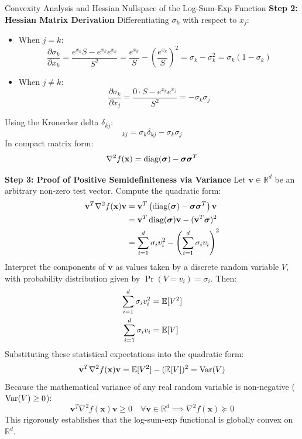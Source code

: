 \begin{examplebox}[breakable]{Convexity Analysis and Hessian Nullspace of the Log-Sum-Exp Function}
\textbf{Step 2: Hessian Matrix Derivation}
Differentiating $\sigma_k$ with respect to $x_j$:
\begin{itemize}
    \item When $j = k$:
    \begin{equation}
    \frac{\partial \sigma_k}{\partial x_k} = \frac{e^{x_k} S - e^{x_k} e^{x_k}}{S^2} = \frac{e^{x_k}}{S} - \left(\frac{e^{x_k}}{S}\right)^2 = \sigma_k - \sigma_k^2 = \sigma_k(1 - \sigma_k)
    \end{equation}
    \item When $j \ne k$:
    \begin{equation}
    \frac{\partial \sigma_k}{\partial x_j} = \frac{0 \cdot S - e^{x_k} e^{x_j}}{S^2} = -\sigma_k \sigma_j
    \end{equation}
\end{itemize}
Using the Kronecker delta $\delta_{kj}$:
\begin{equation}
[\nabla^2 f(\mathbf{x})]_{kj} = \sigma_k \delta_{kj} - \sigma_k \sigma_j
\end{equation}
In compact matrix form:
\begin{equation}
\nabla^2 f(\mathbf{x}) = \operatorname{diag}(\boldsymbol{\sigma}) - \boldsymbol{\sigma}\boldsymbol{\sigma}^T
\end{equation}

\textbf{Step 3: Proof of Positive Semidefiniteness via Variance}
Let $\mathbf{v} \in \mathbb{R}^d$ be an arbitrary non-zero test vector. Compute the quadratic form:
\begin{align}
\mathbf{v}^T \nabla^2 f(\mathbf{x}) \mathbf{v} &= \mathbf{v}^T \left( \operatorname{diag}(\boldsymbol{\sigma}) - \boldsymbol{\sigma}\boldsymbol{\sigma}^T \right) \mathbf{v} \nonumber \\
&= \mathbf{v}^T \operatorname{diag}(\boldsymbol{\sigma}) \mathbf{v} - (\mathbf{v}^T \boldsymbol{\sigma})^2 \nonumber \\
&= \sum_{i=1}^d \sigma_i v_i^2 - \left( \sum_{i=1}^d \sigma_i v_i \right)^2
\end{align}
Interpret the components of $\mathbf{v}$ as values taken by a discrete random variable $V$, with probability distribution given by $\Pr(V = v_i) = \sigma_i$.
Then:
\begin{align}
\sum_{i=1}^d \sigma_i v_i^2 &= \operatorname{\mathbb{E}}[V^2] \\
\sum_{i=1}^d \sigma_i v_i &= \operatorname{\mathbb{E}}[V]
\end{align}
Substituting these statistical expectations into the quadratic form:
\begin{equation}
\mathbf{v}^T \nabla^2 f(\mathbf{x}) \mathbf{v} = \operatorname{\mathbb{E}}[V^2] - (\operatorname{\mathbb{E}}[V])^2 = \operatorname{Var}(V)
\end{equation}
Because the mathematical variance of any real random variable is non-negative ($\operatorname{Var}(V) \ge 0$):
\begin{equation}
\mathbf{v}^T \nabla^2 f(\mathbf{x}) \mathbf{v} \ge 0 \quad \forall \mathbf{v} \in \mathbb{R}^d \implies \nabla^2 f(\mathbf{x}) \succeq 0
\end{equation}
This rigorously establishes that the log-sum-exp functional is globally convex on $\mathbb{R}^d$.


\end{examplebox}
